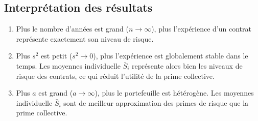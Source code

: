 \documentclass[10pt, french]{article}
\begin{document}
\begin{multicols*}{3}
\subsection{Interprétation des résultats}
\begin{enumerate}
    \item Plus le nombre d'années est grand ($n\to\infty$), plus l'expérience d'un contrat représente exactement son niveau de risque.
    \item Plus $s^2$ est petit ($s^2\to 0$), plus l'expérience est globalement stable dans le temps. Les moyennes individuelle $\bar{S}_i$ représente alors bien les niveaux de risque des contrats, ce qui réduit l'utilité de la prime collective.
    \item Plus $a$ est grand ($a\to\infty$), plus le portefeuille est hétérogène. Les moyennes individuelle $\bar{S}_i$ sont de meilleur approximation des primes de risque que la prime collective.
\end{enumerate}



\end{multicols*}
\end{document}
